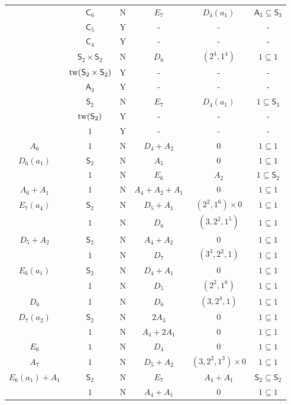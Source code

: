 \documentclass[11pt]{amsart}
\newcommand{\Alt}{{\mathsf{A}}}
\newcommand{\Sym}{{\mathsf{S}}}
\newcommand{\Cyc}{{\mathsf{C}}}
\newcommand{\tw}{{{\mbox{\rm tw}}}}
\numberwithin{equation}{section}
\begin{document}
\begin{center}
\begin{longtable}{|c|c|c|c|c|c|}
			& $\Cyc_6$ & N & $E_7$ & $D_4(a_1)$ & $\Alt_3\subseteq \Sym_3$ \\
			& $\Cyc_5$ & Y & - & - & - \\
			& $\Cyc_4$ & Y & - & - & - \\
			& $\Sym_2\times \Sym_2$ & N & $D_6$ & $(2^4,1^4)$ & $1\subseteq 1$ \\
			& $\tw(\Sym_2\times\Sym_2)$ & Y & - & - & - \\
			& $\Alt_3$ & Y & - & - & - \\
			& $\Sym_2$ & N & $E_7$ & $D_4(a_1)$ & $1\subseteq \Sym_3$ \\
			& $\tw(\Sym_2)$ & Y & - & - & - \\
			& $1$ & Y & - & - & - \\
			\hline
			$A_6$ & $1$ & N & $D_4 + A_2$ & $0$ & $1\subseteq 1$ \\
			\hline
			$D_6(a_1)$ & $\Sym_2$ & N & $A_5$ & $0$ & $1\subseteq 1$ \\
			& $1$ & N & $E_6$ & $A_2$ & $1\subseteq \Sym_2$ \\
			\hline
			$A_6+A_1$ & $1$ & N & $A_4 + A_2 + A_1$ & $0$ & $1\subseteq 1$ \\
			\hline
			$E_7(a_4)$ & $\Sym_2$ & N & $D_5 + A_1$ & $(2^2,1^6)\times 0$ & $1\subseteq 1$ \\
			& $1$ & N & $D_6$ & $(3,2^2,1^5)$ & $1\subseteq 1$  \\
			\hline
			$D_5+A_2$ & $\Sym_2$ & N & $A_4 + A_2$ & $0$ & $1\subseteq 1$ \\
			& $1$ & N & $D_7$ & $(3^3,2^2,1)$ & $1\subseteq 1$ \\
			\hline
			$E_6(a_1)$ & $\Sym_2$ & N & $D_4 + A_1$ & $0$ & $1\subseteq 1$ \\
			& $1$ & N & $D_5$ & $(2^2,1^6)$ & $1\subseteq 1$ \\
			\hline
			$D_6$ & $1$ & N & $D_6$ & $(3,2^4,1)$ & $1\subseteq 1$ \\
			\hline
			$D_7(a_2)$ & $\Sym_2$ & N & $2 A_3$ & $0$ & $1\subseteq 1$\\
			& $1$ & N & $A_4 + 2 A_1$ & $0$ & $1\subseteq 1$ \\
			\hline
			$E_6$ & $1$ & N & $D_4$ & $0$ & $1\subseteq 1$ \\
			\hline
			$A_7$ & $1$ & N & $D_5 + A_2$ & $(3,2^2,1^3)\times 0$ & $1\subseteq 1$ \\
			\hline
			$E_6(a_1)+A_1$ & $\Sym_2$ & N & $E_7$ & $A_4+A_1$ & $\Sym_2\subseteq \Sym_2$ \\
			& $1$ & N & $A_4 + A_1$ & $0$ & $1\subseteq 1$ \\

\end{longtable}
\end{center}
\end{document}
